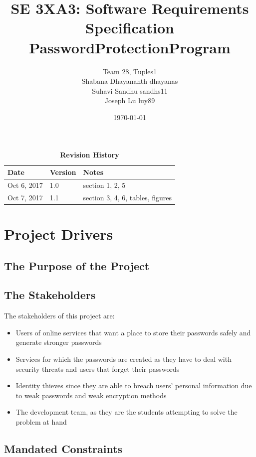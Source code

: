 \documentclass[12pt, titlepage]{article}
\title{SE 3XA3: Software Requirements Specification\\PasswordProtectionProgram}
\author{Team 28, Tuples1
		\\ Shabana Dhayananth dhayanas
		\\  Suhavi Sandhu sandhs11
		\\ Joseph Lu luy89
}
\date{\today}
\begin{document}
\maketitle

\tableofcontents
\listoftables
\listoffigures

\begin{table}[bp]
\caption{\bf Revision History}
\begin{tabularx}{\textwidth}{p{3cm}p{2cm}X}
\toprule {\bf Date} & {\bf Version} & {\bf Notes}\\
\midrule
Oct 6, 2017 & 1.0 & section 1, 2, 5 \\
Oct 7, 2017 & 1.1 & section 3, 4, 6, tables, figures \\
\bottomrule
\end{tabularx}
\end{table}

\newpage


\section{Project Drivers}

\subsection{The Purpose of the Project}

\subsection{The Stakeholders}

The stakeholders of this project are:
\begin{itemize}
\item Users of online services that want a place to store their passwords safely and generate stronger passwords
\item Services for which the passwords are created as they have to deal with security threats and users that forget their passwords
\item Identity thieves since they are able to breach users’ personal information due to weak passwords and weak encryption methods
\item The development team, as they are the students attempting to solve the problem at hand
\end{itemize}

\subsection{Mandated Constraints}
\end{document}

